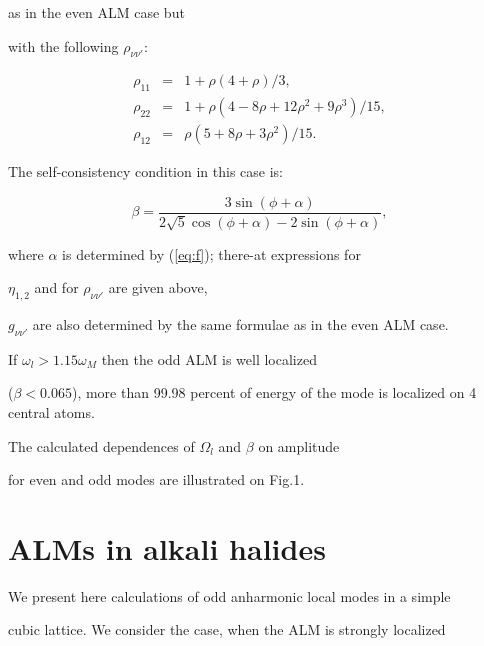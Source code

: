 as in the even ALM case but

with the following $\rho_{\nu\nu'}$:

\begin{eqnarray}

\rho_{11} &=& 1+ \rho (4 +\rho)/3,\nonumber \\

\rho_{22} &=& 1+ \rho (4 -8 \rho + 

12 \rho^2 + 9 \rho^3)/ 15,

\nonumber \\

\rho_{12} &=& \rho (5 + 8\rho + 3\rho^2)/15. \nonumber

\end{eqnarray}

The self-consistency condition in this case is:

\begin{equation}

\beta =\frac{3 \sin{(\phi+\alpha)}}{2\sqrt{5} \cos{(\phi+\alpha)} 

-2\sin{(\phi+\alpha)}},

\end{equation}

where $\alpha$ is determined by (\ref{eq:f}); there-at  expressions for

$\eta_{1,2}$  and for $\rho_{\nu\nu'}$ are given above,

$g_{\nu\nu'}$ are also determined by the same formulae as in the even ALM case.



If $\omega_l > 1.15 \omega_M$ then the odd ALM is well localized 

($\beta < 0.065$),  more than 99.98 percent of energy of the mode is
localized on 4 central atoms.



The calculated dependences of $\Omega_l$ and $\beta$ on amplitude

for even and odd modes are illustrated on Fig.1.



\section{ALMs in alkali halides}

We present here calculations of odd anharmonic local modes in a simple

cubic lattice. We consider the case, when the ALM is strongly localized 

